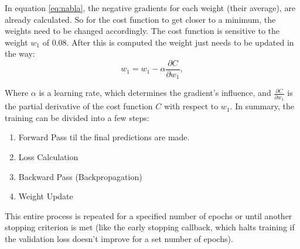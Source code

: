 In equation \ref{eq:nabla}, the negative gradients for each weight (their average), are already calculated. So for the cost function to get closer to a minimum, the weights need to be changed accordingly. The cost function is sensitive to the weight $w_1$ of $0.08$. 
After this is computed the weight just needs to be updated in the way:
\begin{equation*}
	w_1= w_1 -\alpha \frac{\partial C}{\partial w_1} ,
\end{equation*}

Where $\alpha$ is a learning rate, which determines the gradient’s influence, and $\frac{\partial C}{\partial w_1} $ is the partial derivative of the cost function $C$ with respect to $w_1$.\newline
In summary, the training can be divided into a few steps:
\begin{enumerate}[label=\arabic*.]
	\item Forward Pass til the final predictions are made.
	\item Loss Calculation
	\item Backward Pass (Backpropagation)
	\item Weight Update
\end{enumerate}
This entire process is repeated for a specified number of epochs or until another stopping criterion is met (like the early stopping callback, which halts training if the validation loss doesn't improve for a set number of epochs).
